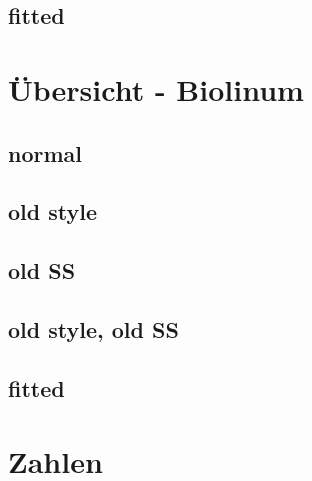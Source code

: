 \documentclass{fontdokuold}
\begin{document}
\subsection{fitted}

\section{Übersicht - Biolinum}

\subsection{normal}

\subsection{old style}

\subsection{old SS}

\subsection{old style, old SS}

\subsection{fitted}

\section{Zahlen}

\begin{minipage}{\linewidth}
\begin{minipage}{.45\linewidth}
\Large
{}
\end{minipage}\hfill
\begin{minipage}{.45\linewidth}
\Large
{}
\end{minipage}
\end{minipage}
\end{document}
